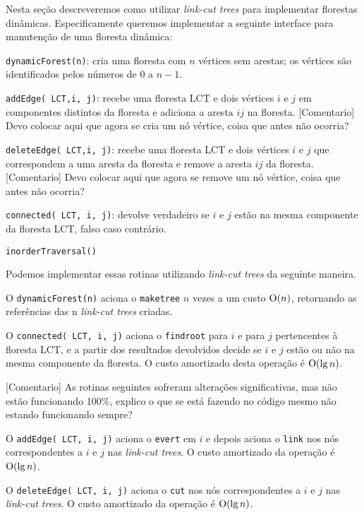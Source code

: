 Nesta seção descreveremos como utilizar \emph{link-cut trees} para implementar florestas dinâmicas. Especificamente queremos implementar a seguinte interface para manutenção de uma floresta dinâmica:

\begin{itemize}
    \item \texttt{dynamicForest(n)}: cria uma floresta com $n$ vértices sem arestas; os vértices são identificados pelos números de $0$ a $n-1$.  
    \item \texttt{addEdge({\color{red} LCT},i, j)}: {\color{red}recebe uma floresta LCT} e  dois vértices $i$ e $j$ em componentes distintos da floresta e adiciona a aresta $ij$ na floresta.  {\color{red}[Comentario] Devo colocar aqui que agora se cria um nó vértice, coisa que antes não ocorria?}
    \item \texttt{deleteEdge({\color{red} LCT},i, j)}: {\color{red}recebe uma floresta  LCT} e dois vértices $i$ e $j$ que correspondem a uma aresta da floresta e remove a aresta $ij$ da floresta.  {\color{red}[Comentario] Devo colocar aqui que agora se remove um nó vértice, coisa que antes não ocorria?}
    \item \texttt{connected({\color{red} LCT}, i, j)}: devolve verdadeiro se $i$ e $j$ estão na mesma componente da floresta {\color{red} LCT}, falso caso contrário.  
    {\color{red} \item \texttt{inorderTraversal()}}
\end{itemize}


Podemos implementar essas rotinas utilizando \emph{link-cut trees} da seguinte maneira.

O \texttt{dynamicForest(n)} aciona o \texttt{maketree} $n$ vezes a um custo $\mathrm{O}(n)$, retornando as referências das n \emph{link-cut trees} criadas.  

O \texttt{connected({\color{red} LCT}, i, j)} aciona o \texttt{findroot} para $i$ e para $j$ pertencentes à floresta LCT, e a partir dos resultados devolvidos decide se $i$ e $j$ estão ou não na mesma componente da floresta. O custo amortizado desta operação é $\mathrm{O}(\lg n)$.  

{\color{red}[Comentario] As rotinas seguintes sofreram alterações significativas, mas não estão funcionando 100\%, explico o que se está fazendo no código mesmo não estando funcionando sempre?}

O \texttt{addEdge({\color{red} LCT}, i, j)} aciona o \texttt{evert} em $i$ e depois aciona o \texttt{link} nos nós correspondentes a $i$ e $j$ nas \emph{link-cut trees}. O custo amortizado da operação é $\mathrm{O}(\lg n)$.  

O \texttt{deleteEdge({\color{red} LCT}, i, j)} aciona o \texttt{cut} nos nós correspondentes a $i$ e $j$ nas \emph{link-cut trees}. O custo amortizado da operação é $\mathrm{O}(\lg n)$.  

